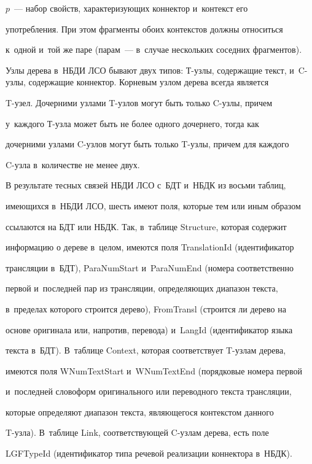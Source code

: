 $p$~--- набор свойств, характеризующих коннектор и~контекст его 


употребления. При этом фрагменты обоих контекстов должны относиться 


к~одной и~той же паре (парам~--- в~случае нескольких соседних фрагментов).


  


  Узлы дерева в~НБДИ ЛСО бывают двух типов: Т-узлы, содержащие текст, и~C-уз\-лы, содержащие коннектор. Корневым узлом дерева всегда является 


T-узел. Дочерними узлами T-уз\-лов могут быть только C-уз\-лы, причем 


у~каж\-до\-го Т-уз\-ла может быть не более одного дочернего, тогда как 


дочерними узлами C-уз\-лов могут быть только T-уз\-лы, причем для каж\-до\-го 


C-уз\-ла в~количестве не менее двух.


  


  В результате тесных связей НБДИ ЛСО с~БДТ и~НБДК из восьми таб\-лиц, 


имеющихся в~НБДИ ЛСО, шесть имеют поля, которые тем или иным образом 


ссылаются на БДТ или НБДК. Так, в~таблице Structure, которая содержит 


информацию о дереве в~целом, имеются поля TranslationId (идентификатор 


трансляции в~БДТ), ParaNumStart и~ParaNumEnd (номера соответственно 


первой и~последней пар из трансляции, определяющих диапазон текста, 


в~пределах которого строится дерево), FromTransl (строится ли дерево на 


основе оригинала или, напротив, перевода) и~LangId (идентификатор языка 


текста в~БДТ). В~таб\-ли\-це Context, которая соответствует T-уз\-лам дерева, 


имеются поля WNumTextStart и~WNumTextEnd (порядковые номера первой 


и~последней словоформ оригинального или переводного текста трансляции, 


которые определяют диапазон текста, являющегося контекстом данного  


T-уз\-ла). В~таб\-ли\-це Link, соответствующей C-уз\-лам дерева, есть поле 


LGFTypeId (идентификатор типа речевой реализации коннектора в~НБДК). 


